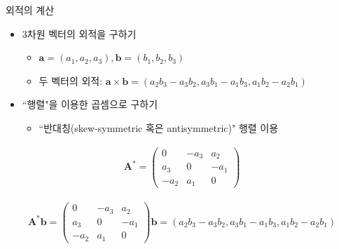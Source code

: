 

\begin{frame}{외적의 계산}

\begin{itemize}
\item 3차원 벡터의 외적을 구하기
	\begin{itemize}
	\item $\mathbf a=(a_1, a_2, a_3), \mathbf b=(b_1, b_2, b_3)$
	\item 두 벡터의 외적: $\mathbf a \times \mathbf b = (a_2 b_3 - a_3 b_2, a_3 b_1 - a_1 b_3, a_1 b_2 - a_2 b_1)$
	\end{itemize}
\item ``행렬"을 이용한 곱셈으로 구하기
	\begin{itemize}
	\item ``반대칭(skew-symmetric 혹은 antisymmetric)" 행렬 이용
	\end{itemize}
\end{itemize}

\begin{eqnarray}
\mathbf A^* = \left ( 
\begin{array}{ccc}
0 & -a_3 & a_2 \\
a_3 & 0 & -a_1 \\
-a_2 & a_1 & 0 \nonumber
\end{array}
\right ) \nonumber
\end{eqnarray}

\begin{eqnarray}
\mathbf A^* \mathbf b = \left ( 
\begin{array}{ccc}
0 & -a_3 & a_2 \\
a_3 & 0 & -a_1 \\
-a_2 & a_1 & 0
\end{array}
\right ) \mathbf b
= (a_2 b_3 - a_3 b_2, a_3 b_1 - a_1 b_3, a_1 b_2 - a_2 b_1 ) \nonumber
\end{eqnarray}

\end{frame}




